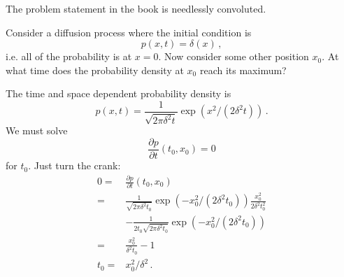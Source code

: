 

The problem statement in the book is needlessly convoluted.

Consider a diffusion process where the initial condition is
\begin{equation*}
  p(x,t) = \delta(x) \, ,
\end{equation*}
i.e. all of the probability is at $x=0$.
Now consider some other position $x_0$.
At what time does the probability density at $x_0$ reach its maximum?


The time and space dependent probability density is
\begin{equation*}
  p(x, t) =
    \frac{1}{\sqrt{2 \pi \delta^2 t}}
    \exp \left( x^2 / (2 \delta ^2 t) \right) \, .
\end{equation*}
We must solve
\begin{equation*}
  \frac{\partial p}{\partial t}(t_0, x_0) = 0
\end{equation*}
for $t_0$.
Just turn the crank:
\begin{align*}
  0
  =& \frac{\partial p}{\partial t}(t_0, x_0) \\
  =&
    \frac{1}{\sqrt{2 \pi \delta^2 t_0}} \exp \left( -x_0^2 / (2 \delta^2 t_0) \right)
      \frac{x_0^2}{2 \delta^2 t_0^2} \\
  &- \frac{1}{2 t_0 \sqrt{2 \pi \delta^2 t_0}} \exp \left( -x_0^2 / (2 \delta^2 t_0) \right) \\
  =&
    \frac{x_0^2}{\delta^2 t_0}
  - 1 \\
  t_0 =& x_0^2 / \delta^2 \, .
\end{align*}

